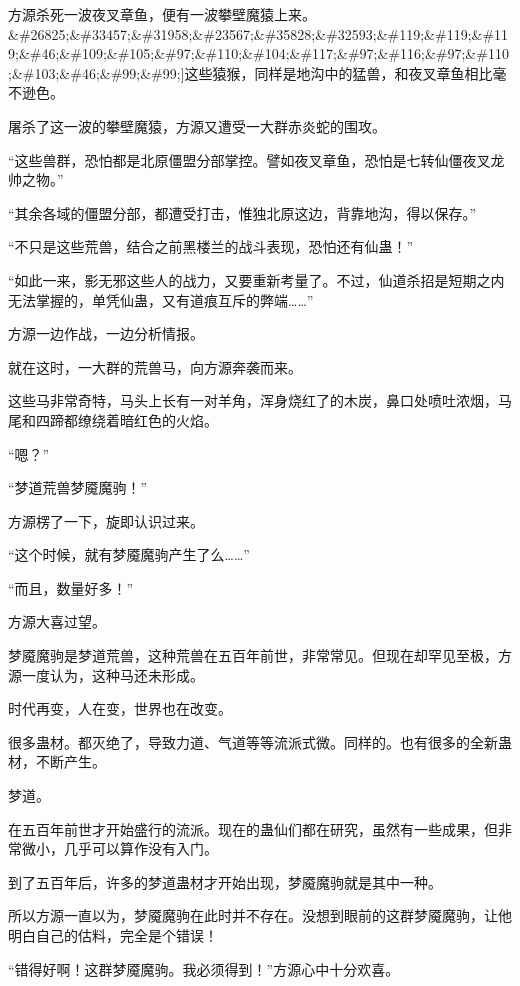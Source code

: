 
\begin{this_body}

方源杀死一波夜叉章鱼，便有一波攀壁魔猿上来。\&\#26825;\&\#33457;\&\#31958;\&\#23567;\&\#35828;\&\#32593;\&\#119;\&\#119;\&\#119;\&\#46;\&\#109;\&\#105;\&\#97;\&\#110;\&\#104;\&\#117;\&\#97;\&\#116;\&\#97;\&\#110;\&\#103;\&\#46;\&\#99;\&\#99;]这些猿猴，同样是地沟中的猛兽，和夜叉章鱼相比毫不逊色。

屠杀了这一波的攀壁魔猿，方源又遭受一大群赤炎蛇的围攻。

“这些兽群，恐怕都是北原僵盟分部掌控。譬如夜叉章鱼，恐怕是七转仙僵夜叉龙帅之物。”

“其余各域的僵盟分部，都遭受打击，惟独北原这边，背靠地沟，得以保存。”

“不只是这些荒兽，结合之前黑楼兰的战斗表现，恐怕还有仙蛊！”

“如此一来，影无邪这些人的战力，又要重新考量了。不过，仙道杀招是短期之内无法掌握的，单凭仙蛊，又有道痕互斥的弊端……”

方源一边作战，一边分析情报。

就在这时，一大群的荒兽马，向方源奔袭而来。

这些马非常奇特，马头上长有一对羊角，浑身烧红了的木炭，鼻口处喷吐浓烟，马尾和四蹄都缭绕着暗红色的火焰。

“嗯？”

“梦道荒兽梦魇魔驹！”

方源楞了一下，旋即认识过来。

“这个时候，就有梦魇魔驹产生了么……”

“而且，数量好多！”

方源大喜过望。

梦魇魔驹是梦道荒兽，这种荒兽在五百年前世，非常常见。但现在却罕见至极，方源一度认为，这种马还未形成。

时代再变，人在变，世界也在改变。

很多蛊材。都灭绝了，导致力道、气道等等流派式微。同样的。也有很多的全新蛊材，不断产生。

梦道。

在五百年前世才开始盛行的流派。现在的蛊仙们都在研究，虽然有一些成果，但非常微小，几乎可以算作没有入门。

到了五百年后，许多的梦道蛊材才开始出现，梦魇魔驹就是其中一种。

所以方源一直以为，梦魇魔驹在此时并不存在。没想到眼前的这群梦魇魔驹，让他明白自己的估料，完全是个错误！

“错得好啊！这群梦魇魔驹。我必须得到！”方源心中十分欢喜。


\end{this_body}
